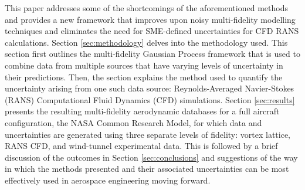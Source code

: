This paper addresses some of the shortcomings of the aforementioned methods and provides a new framework that improves upon noisy multi-fidelity modelling techniques and eliminates the need for SME-defined uncertainties for CFD RANS calculations. Section \ref{sec:methodology} delves into the methodology used. This section first outlines the multi-fidelity Gaussian Process framework that is used to combine data from multiple sources that have varying levels of uncertainty in their predictions. Then, the section explains the method used to quantify the uncertainty arising from one such data source: Reynolds-Averaged Navier-Stokes (RANS) Computational Fluid Dynamics (CFD) simulations. Section \ref{sec:results} presents the resulting multi-fidelity aerodynamic databases for a full aircraft configuration, the NASA Common Research Model, for which data and uncertainties are generated using three separate levels of fidelity: vortex lattice, RANS CFD, and wind-tunnel experimental data. This is followed by a brief discussion of the outcomes in Section \ref{sec:conclusions} and suggestions of the way in which the methods presented and their associated uncertainties can be most effectively used in aerospace engineering moving forward.